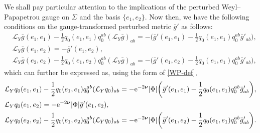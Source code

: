 \documentclass[pdftex]{sigma}
\def\mbo#1{\boldsymbol{#1}}%
\def\halb{\frac{1}{2}}%
\numberwithin{equation}{section}
\begin{document}
We shall pay particular attention to the implications of the perturbed Weyl--Papapetrou gauge on $\Sigma$ and the basis $\{ e_1, e_2\}$. Now then, we have the following conditions on the gauge-transformed perturbed metric $\bar{g}'$ as follows:
\begin{align*}
&\mathcal{L}_Y \bar{g} (e_1, e_1) -\halb q_{0} (e_1, e_1) q^{ab}_0 (\mathcal{L}_{Y} \bar{g} ) _{ab}= - \biggl(\bar{g}' (e_1, e_1) - \halb q_0 (e_1, e_1) q^{ab}_0 \bar{g}'_{ab} \biggr) , \\
&\mathcal{L}_Y \bar{g} (e_1, e_2)= - \bar{g}' (e_1, e_2) , \\
&\mathcal{L}_Y \bar{g} (e_2, e_2) -\halb q_{0} (e_1, e_2) q^{ab}_0 (\mathcal{L}_{Y} \bar{g} ) _{ab}= - \biggl(\bar{g}' (e_1, e_2) - \halb q_0 (e_1, e_1) q^{ab}_0 \bar{g}'_{ab} \biggr),
\end{align*}
which can further be expressed as, using the form of \eqref{WP-def},
\begin{align*}
&\mathcal{L}_Y q_0 (e_1, e_1) -\halb q_{0} (e_1, e_1) q^{ab}_0 (\mathcal{L}_{Y} q_0 ) _{ab}= - {\rm e}^{-2 \mbo{\nu}}\vert \Phi \vert \biggl(\bar{g}' (e_1, e_1) - \halb q_0 (e_1, e_1) q^{ab}_0 \bar{g}'_{ab} \biggr) , \\
&\mathcal{L}_Y q_0 (e_1, e_2)= -{\rm e}^{-2\mbo{\nu}} \vert \Phi \vert \bar{g}' (e_1, e_2) , \\
&\mathcal{L}_Y q_0 (e_2, e_2) -\halb q_{0} (e_1, e_2) q^{ab}_0 (\mathcal{L}_{Y} q_0 ) _{ab}= - {\rm e}^{-2\mbo{\nu}}\vert \Phi \vert \biggl(\bar{g}' (e_1, e_2) - \halb q_0 (e_1, e_1) q^{ab}_0 \bar{g}'_{ab} \biggr).
\end{align*}
\end{document}
